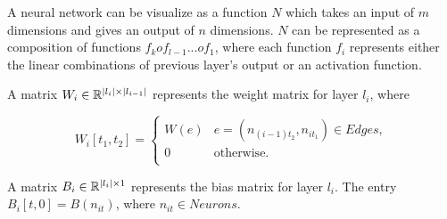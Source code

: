 A neural network can be visualize as a function $N$ which takes an input of $m$ dimensions and gives an 
output of $n$ dimensions. $N$ can be represented as a composition of functions $f_k o f_{l-1} ... o f_1$,
where each function $f_i$ represents either the linear combinations of previous layer's
output or an activation function. 



\begin{df}
  A matrix $W_i \in \mathbb{R}^{|l_i|\times|l_{i-1}|}$ represents the weight matrix for layer $l_i$, where
  
    $$
    W_i[t_1, t_2] = 
    \begin{cases}
      W(e) & e=(n_{(i-1)t_2}, n_{it_1}) \in Edges,\\
      0 & \text{otherwise.}\\
    \end{cases}
    $$
\end{df}

\begin{df}
    A matrix $B_i \in \mathbb{R}^{|l_i|\times 1}$ represents the bias matrix for layer $l_i$. The entry $B_i[t,0] = B(n_{it})$, where $n_{it} \in Neurons$. 
\end{df}



